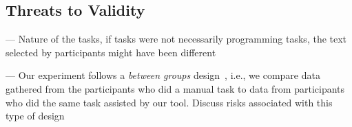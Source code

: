 
\clearpage

\subsection{Threats to Validity}
\label{cp6:threats}


--- Nature of the tasks, if tasks were not necessarily programming tasks, the text selected by participants might have been different


--- Our experiment follows a \textit{between groups} design~\cite{Lazar2017-cp3}, i.e., we compare data gathered from the participants who did a manual task 
 to data from participants who did the same task assisted by our tool. Discuss risks associated with this type of design
